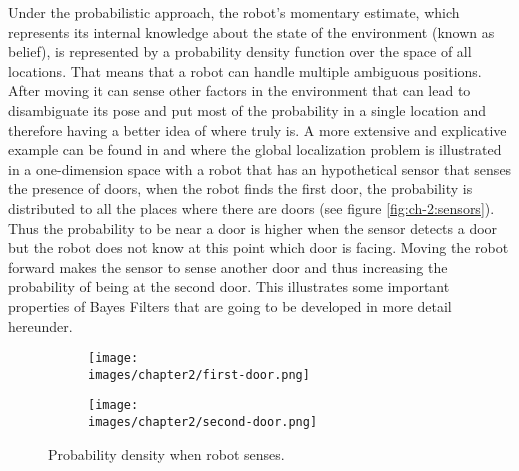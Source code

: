 Under the probabilistic approach, the robot’s momentary estimate, which represents its internal knowledge about the state of the environment (known as belief), is represented by a probability density function over the space of all locations\cite{Thrun:robotic-statistics}. That means that a robot can handle multiple ambiguous positions. After moving it can sense other factors in the environment that can lead to disambiguate its pose and put most of the probability in a single location and therefore having a better idea of where truly is. A more extensive and explicative example can be found in \cite{Thrun:robotic-statistics} and \cite{Liao:bayesian-filters} where the global localization problem is illustrated in a one-dimension space with a robot that has an hypothetical sensor that senses the presence of doors, when the robot finds the first door, the probability is distributed to all the places where there are doors (see figure \ref{fig:ch-2:sensors}). Thus the probability to be near a door is higher when the sensor detects a door but the robot does not know at this point which door is facing. Moving the robot forward makes the sensor to sense another door and thus increasing the probability of being at the second door. This illustrates some important properties of Bayes Filters that are going to be developed in more detail hereunder.

\begin{figure}[h!]
  \centering
  \begin{subfigure}[b]{\linewidth}
  	\texttt{[image: \\images/chapter2/first-door.png]}
  \end{subfigure}
  \vspace{1cm}
  \begin{subfigure}[b]{\linewidth}
  	\texttt{[image: \\images/chapter2/second-door.png]}
  \end{subfigure}
  \caption{Probability density when robot senses.}
  \label{fig:ch-2:bayes-filter-example}
\end{figure}

























